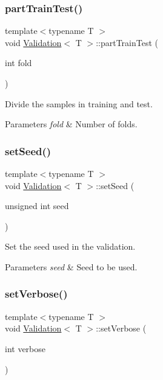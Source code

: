 \subsubsection{\texorpdfstring{part\+Train\+Test()}{partTrainTest()}}
{\footnotesize\ttfamily template$<$typename T $>$ \\
void \mbox{\hyperlink{class_validation}{Validation}}$<$ T $>$\+::part\+Train\+Test (\begin{DoxyParamCaption}\item[{int}]{fold }\end{DoxyParamCaption})}



Divide the samples in training and test. 


\begin{DoxyParams}{Parameters}
{\em fold} & Number of folds. \\
\hline
\end{DoxyParams}
\mbox{\label{class_validation_a26fec6a8582bded0583a4754cdba0009}} 
\subsubsection{\texorpdfstring{set\+Seed()}{setSeed()}}
{\footnotesize\ttfamily template$<$typename T $>$ \\
void \mbox{\hyperlink{class_validation}{Validation}}$<$ T $>$\+::set\+Seed (\begin{DoxyParamCaption}\item[{unsigned int}]{seed }\end{DoxyParamCaption})}



Set the seed used in the validation. 


\begin{DoxyParams}{Parameters}
{\em seed} & Seed to be used. \\
\hline
\end{DoxyParams}
\mbox{\label{class_validation_adddf2e9eb960b7636e6615ecbd9783bb}} 
\subsubsection{\texorpdfstring{set\+Verbose()}{setVerbose()}}
{\footnotesize\ttfamily template$<$typename T $>$ \\
void \mbox{\hyperlink{class_validation}{Validation}}$<$ T $>$\+::set\+Verbose (\begin{DoxyParamCaption}\item[{int}]{verbose }\end{DoxyParamCaption})\hspace{0.3cm}{\ttfamily [inline]}}




